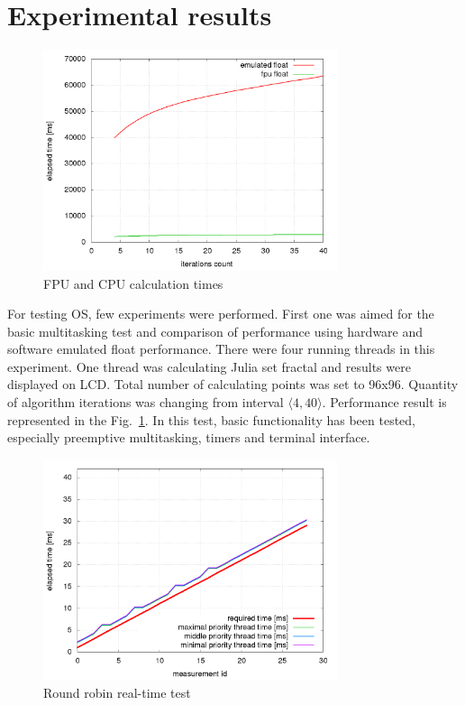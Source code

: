 \documentclass[a4paper, conference]{IEEEtran}
\begin{document}
\section{Experimental results}

\begin{figure}[]
\centering
\includegraphics[width=3.4in]{fpu_cpu_performance.png}
\caption{FPU and CPU calculation times}
\label{fig_fpu_cpu}
\end{figure}

For testing OS, few experiments were performed. First one was aimed for the basic multitasking test and comparison of performance using hardware and software emulated float performance.
There were four running threads in this experiment. One thread was calculating Julia set fractal and results were displayed on LCD. Total number of calculating points was set to 96x96.
Quantity of algorithm iterations was changing from interval $\langle 4, 40 \rangle$. Performance result is represented in the Fig.~\ref{fig_fpu_cpu}. In this test, basic functionality has been tested, especially preemptive multitasking, timers and terminal interface.



\begin{figure}[]
\centering
\includegraphics[width=3.4in]{round_robin_scheduler_perfomance.png}
\caption{Round robin real-time test}
\label{fig_round_robin_scheduler_perfomance}
\end{figure}
\end{document}

